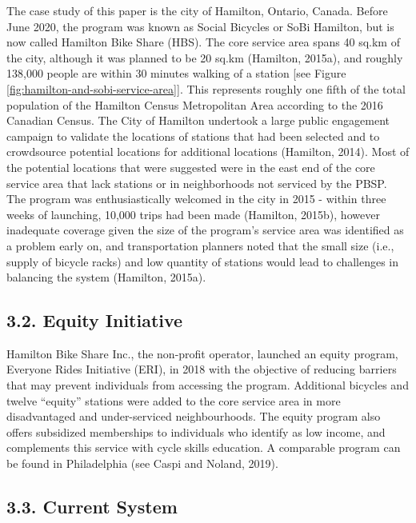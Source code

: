 \documentclass[]{elsarticle} %
\begin{document}
The case study of this paper is the city of Hamilton, Ontario, Canada.
Before June 2020, the program was known as Social Bicycles or SoBi
Hamilton, but is now called Hamilton Bike Share (HBS). The core service
area spans 40 sq.km of the city, although it was planned to be 20 sq.km
(Hamilton, 2015a), and roughly 138,000 people are within 30 minutes
walking of a station {[}see Figure
\ref{fig:hamilton-and-sobi-service-area}{]}. This represents roughly one
fifth of the total population of the Hamilton Census Metropolitan Area
according to the 2016 Canadian Census. The City of Hamilton undertook a
large public engagement campaign to validate the locations of stations
that had been selected and to crowdsource potential locations for
additional locations (Hamilton, 2014). Most of the potential locations
that were suggested were in the east end of the core service area that
lack stations or in neighborhoods not serviced by the PBSP. The program
was enthusiastically welcomed in the city in 2015 - within three weeks
of launching, 10,000 trips had been made (Hamilton, 2015b), however
inadequate coverage given the size of the program's service area was
identified as a problem early on, and transportation planners noted that
the small size (i.e., supply of bicycle racks) and low quantity of
stations would lead to challenges in balancing the system (Hamilton,
2015a).

\hypertarget{equity-initiative}{%
\subsection{3.2. Equity Initiative}\label{equity-initiative}}

Hamilton Bike Share Inc., the non-profit operator, launched an equity
program, Everyone Rides Initiative (ERI), in 2018 with the objective of
reducing barriers that may prevent individuals from accessing the
program. Additional bicycles and twelve ``equity'' stations were added
to the core service area in more disadvantaged and under-serviced
neighbourhoods. The equity program also offers subsidized memberships to
individuals who identify as low income, and complements this service
with cycle skills education. A comparable program can be found in
Philadelphia (see Caspi and Noland, 2019).

\hypertarget{current-system}{%
\subsection{3.3. Current System}\label{current-system}}
\end{document}
